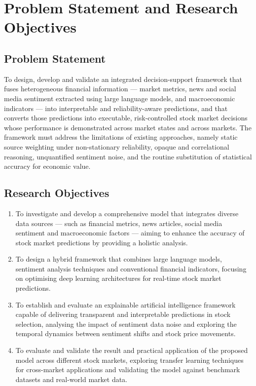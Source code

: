 \chapter{Problem Statement and Research Objectives}

\section{Problem Statement}

To design, develop and validate an integrated decision-support framework that fuses
heterogeneous financial information --- market metrics, news and social media sentiment
extracted using large language models, and macroeconomic indicators --- into
interpretable and reliability-aware predictions, and that converts those predictions into
executable, risk-controlled stock market decisions whose performance is demonstrated
across market states and across markets. The framework must address the limitations of
existing approaches, namely static source weighting under non-stationary reliability,
opaque and correlational reasoning, unquantified sentiment noise, and the routine
substitution of statistical accuracy for economic value.

\section{Research Objectives}

\begin{enumerate}[label=\textbf{RO\arabic*.},leftmargin=2.6em]
\item To investigate and develop a comprehensive model that integrates diverse data
sources --- such as financial metrics, news articles, social media sentiment and
macroeconomic factors --- aiming to enhance the accuracy of stock market predictions by
providing a holistic analysis.

\item To design a hybrid framework that combines large language models, sentiment
analysis techniques and conventional financial indicators, focusing on optimising deep
learning architectures for real-time stock market predictions.

\item To establish and evaluate an explainable artificial intelligence framework capable
of delivering transparent and interpretable predictions in stock selection, analysing the
impact of sentiment data noise and exploring the temporal dynamics between sentiment
shifts and stock price movements.

\item To evaluate and validate the result and practical application of the proposed model
across different stock markets, exploring transfer learning techniques for cross-market
applications and validating the model against benchmark datasets and real-world market
data.
\end{enumerate}

